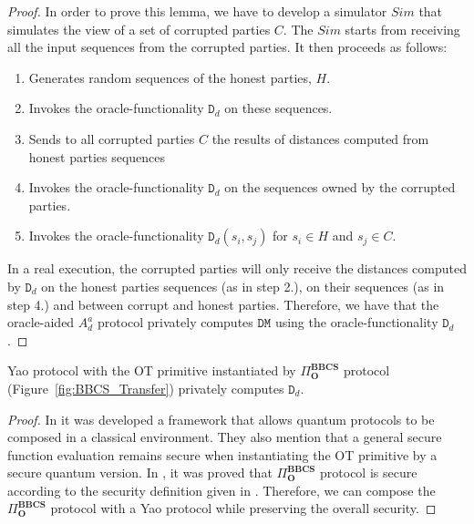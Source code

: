 \begin{proof}
In order to prove this lemma, we have to develop a simulator $Sim$ that simulates the view of a set of corrupted parties $C$. The $Sim$ starts from receiving all the input sequences from the corrupted parties. It then proceeds as follows:

\begin{enumerate}
    \item Generates random sequences of the honest parties, $H$.
    \item Invokes the oracle-functionality $\mathtt{D}_d$ on these sequences.
    \item Sends to all corrupted parties $C$ the results of distances computed from honest parties sequences
    \item Invokes the oracle-functionality $\mathtt{D}_d$ on the sequences owned by the corrupted parties.
    \item Invokes the oracle-functionality $\mathtt{D}_d(s_i, s_j)$ for $s_i\in H$ and $s_j\in C$. 
\end{enumerate}

In a real execution, the corrupted parties will only receive the distances computed by $\mathtt{D}_d$ on the honest parties sequences (as in step 2.), on their sequences (as in step 4.) and between corrupt and honest parties. Therefore, we have that the oracle-aided $A^a_d$ protocol privately computes $\mathtt{DM}$ using the oracle-functionality $\mathtt{D}_d$.

\end{proof}

\begin{lemma}\label{secondlemma}
Yao protocol with the OT primitive instantiated by $\Pi^{\textbf{BBCS}}_{\textbf{O}}$ protocol (Figure~\ref{fig:BBCS_Transfer}) privately computes $\mathtt{D}_d$.
\end{lemma}

\begin{proof}

In \cite{FS09} it was developed a framework that allows quantum protocols to be composed in a classical environment. They also mention that a general secure function evaluation remains secure when instantiating the OT primitive by a secure quantum version. In \cite{Damgrd2009}, it was proved that $\Pi^{\textbf{BBCS}}_{\textbf{O}}$ protocol is secure according to the security definition given in \cite{FS09}. Therefore, we can compose the $\Pi^{\textbf{BBCS}}_{\textbf{O}}$ protocol with a Yao protocol \cite{Lindell2008} while preserving the overall security. 

\end{proof}


